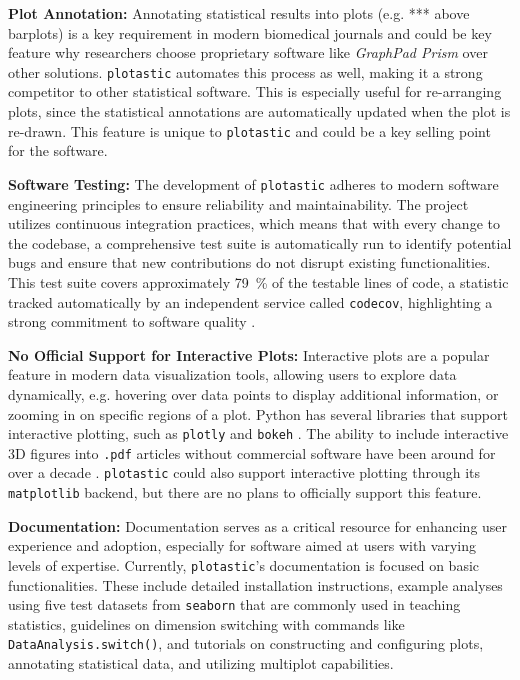 \textbf{Plot Annotation:} Annotating statistical results into plots (e.g. ***
above barplots) is a key requirement in modern biomedical journals and could be
key feature why researchers choose proprietary software like \textit{GraphPad
    Prism} over other solutions. \texttt{plotastic} automates this process as well,
making it a strong competitor to other statistical software. This is especially
useful for re-arranging plots, since the statistical annotations are
automatically updated when the plot is re-drawn. This feature is unique to
\texttt{plotastic} and could be a key selling point for the software.


\textbf{Software Testing:} The development of \texttt{plotastic} adheres to
modern software engineering principles to ensure reliability and
maintainability. The project utilizes continuous integration practices, which
means that with every change to the codebase, a comprehensive test suite is
automatically run to identify potential bugs and ensure that new contributions
do not disrupt existing functionalities. This test suite covers approximately
\SI{79}{\percent} of the testable lines of code, a statistic tracked
automatically by an independent service called \texttt{codecov}, highlighting a
strong commitment to software quality \cite{Codecov}.

\textbf{No Official Support for Interactive Plots:} Interactive plots are a popular feature
in modern data visualization tools, allowing users to explore data dynamically,
e.g. hovering over data points to display additional information, or zooming in
on specific regions of a plot. Python has several libraries that support
interactive plotting, such as \texttt{plotly} and \texttt{bokeh}
\cite{plotly,bokehdevelopmentteamBokehPythonLibrary2018}. The ability to include
interactive 3D figures into \texttt{.pdf} articles without commercial software
have been around for over a decade
\cite{barnesEmbeddingPublishingInteractive2013}. \texttt{plotastic} could
also support interactive plotting through its \texttt{matplotlib} backend,
but there are no plans to officially support this feature.

\textbf{Documentation:}
Documentation serves as a critical resource for enhancing user experience and
adoption, especially for software aimed at users with varying levels of
expertise. Currently, \texttt{plotastic}'s documentation is focused on basic
functionalities. These include detailed installation instructions, example
analyses using five test datasets from \texttt{seaborn} that are commonly used
in teaching statistics, guidelines on dimension switching with commands like
\texttt{DataAnalysis.switch()}, and tutorials on constructing and configuring
plots, annotating statistical data, and utilizing multiplot capabilities.

